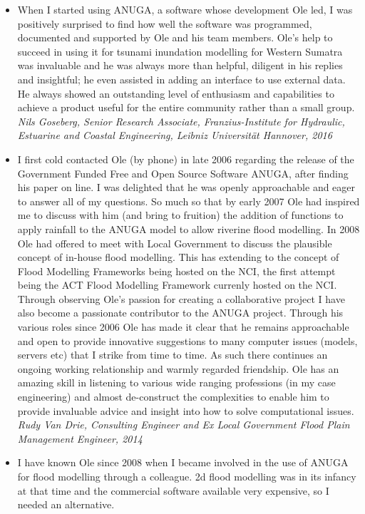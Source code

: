 \documentclass[11pt,a4paper]{article}
\begin{document}
\begin{itemize}
\item
  When I started using ANUGA, a software whose development Ole led, I was positively surprised to find how well the software was programmed, documented and supported by Ole and his team members. Ole's help to succeed in using it for tsunami inundation modelling for Western Sumatra was invaluable and he was always more than helpful, diligent in his replies and insightful; he even assisted in adding an interface to use external data. He always showed an outstanding level of enthusiasm and capabilities to achieve a product useful for the entire community rather than a small group.
  \emph{Nils Goseberg, Senior Research Associate, Franzius-Institute for Hydraulic, Estuarine and Coastal Engineering, Leibniz Universität Hannover, 2016}

\item
  I first cold contacted Ole (by phone) in late 2006 regarding the release of the Government Funded Free and Open Source Software ANUGA, after finding his paper on line. I was delighted that he was openly approachable and eager to answer all of my questions. So much so that by early 2007 Ole had inspired me to discuss with him (and bring to fruition) the addition of functions to apply rainfall to the ANUGA model to allow riverine flood modelling. In 2008 Ole had offered to meet with Local Government to discuss the plausible concept of in-house flood modelling. This has extending to the concept of Flood Modelling Frameworks being hosted on the NCI, the first attempt being the ACT Flood Modelling Framework currenly hosted on the NCI.  
Through observing Ole's passion for creating a collaborative project I have also become a passionate contributor to the ANUGA project. Through his various roles since 2006 Ole has made it clear that he remains approachable and open to provide innovative suggestions to many computer issues (models, servers etc) that I strike from time to time. As such there continues an ongoing working relationship and warmly regarded friendship. Ole has an amazing skill in listening to various wide ranging professions (in my case engineering) and almost de-construct the complexities to enable him to provide invaluable advice and insight into how to solve computational issues.  
\emph{Rudy Van Drie, Consulting Engineer and Ex Local Government Flood Plain Management Engineer, 2014}

\item
I have known Ole since 2008 when I became involved in the use of ANUGA for flood modelling through a colleague. 2d flood modelling was in its infancy at that time and the commercial software available very expensive, so I needed an alternative.


\end{itemize}
\end{document}
